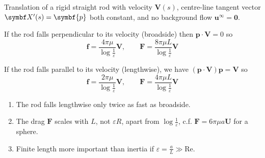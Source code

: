 \documentclass{jknotes}
\begin{document}
\begin{eg}
	Translation of a rigid straight rod with velocity $\symbf{V}(s)$, centre-line
	tangent vector $\X'(s) = \symbf{p}$ both constant, and no background flow
	$\symbf{u}^\infty = \symbf{0}$.
	\begin{center}
	\end{center}

	If the rod falls perpendicular to its velocity (broadside) then $\symbf{p} \cdot
	\symbf{V} = 0$ so
	\begin{equation}
		\symbf{f} = \frac{4\pi\mu}{\log \frac{1}{\varepsilon}} \symbf{V},
		\hspace{2em} \symbf{F} = \frac{8\pi\mu L}{\log
		\frac{1}{\varepsilon}}\symbf{V}
	\end{equation}

	If the rod falls parallel to its velocity (lengthwise), we have
	$(\symbf{p}\cdot\symbf{V})\symbf{p} = \symbf{V}$ so
	\begin{equation}
		\symbf{f} = \frac{2\pi\mu}{\log \frac{1}{\varepsilon}} \symbf{V},
		\hspace{2em} \symbf{F} = \frac{4\pi\mu L}{\log
		\frac{1}{\varepsilon}}\symbf{V}
	\end{equation}

	\begin{enumerate}
		\item The rod falls lengthwise only twice as fast as broadside.
		\item The drag $\symbf{F}$ scales with $L$, not $\varepsilon R$, apart
			from $\log \frac{1}{\varepsilon}$, c.f. $\symbf{F} = 6\pi\mu a
			\symbf{U}$ for a sphere.
		\item Finite length more important than inertia if $\varepsilon =
			\frac{a}{L} \gg \text{Re}$.
		\end{enumerate}
\end{eg}
\end{document}
